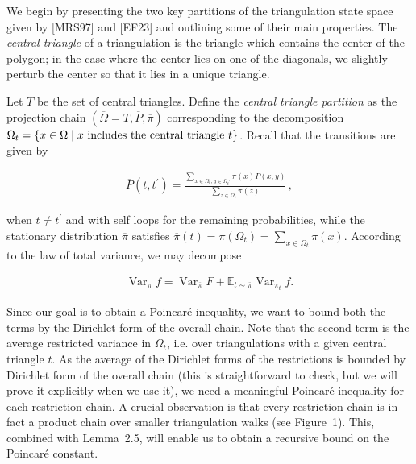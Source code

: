 We begin by presenting the two key partitions of the triangulation state space given by [MRS97] and [EF23] and outlining some of their main properties. The \emph{central triangle} of a triangulation is the triangle which contains the center of the polygon; in the case where the center lies on one of the diagonals, we slightly perturb the center so that it lies in a unique triangle.\par




Let $T$ be the set of central triangles. Define the \emph{central triangle partition} as the projection chain $\left(\overline{\Omega}=T,\overline{P},\overline{\pi}\right)$ corresponding to the decomposition $\Omega_{t}=\{x\in\Omega\mid x\textnormal{ includes the central triangle }t\}$. Recall that the transitions are given by\par


\[\begin{gathered}
\overline{P}(t,t^{\prime})=\frac{\sum_{x\in\Omega_{t},y\in\Omega_{t^{\prime}}}\pi(x)P(x,y)}{\sum_{z\in\Omega_{t}}\pi(z)}\,,
\end{gathered}\]


when $t\neq t^{\prime}$ and with self loops for the remaining probabilities, while the stationary distribution $\overline{\pi}$ satisfies $\overline{\pi}(t)=\pi(\Omega_{t})=\sum_{x\in\Omega_{t}}\pi(x)$. According to the law of total variance, we may decompose\par


\[\begin{gathered}
\operatorname{Var}_{\pi}f=\operatorname{Var}_{\overline{\pi}}F+\mathbb{E}_{t\sim\overline{\pi}}\operatorname{Var}_{\pi_{t}}f.
\end{gathered}\]




Since our goal is to obtain a Poincaré inequality, we want to bound both the terms by the Dirichlet form of the overall chain. Note that the second term is the average restricted variance in $\Omega_{t}$, i.e. over triangulations with a given central triangle $t$. As the average of the Dirichlet forms of the restrictions is bounded by Dirichlet form of the overall chain (this is straightforward to check, but we will prove it explicitly when we use it), we need a meaningful Poincaré inequality for each restriction chain. A crucial observation is that every restriction chain is in fact a product chain over smaller triangulation walks (see Figure 1). This, combined with Lemma 2.5, will enable us to obtain a recursive bound on the Poincaré constant.\par



